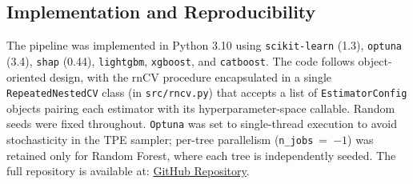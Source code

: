 \subsection{Implementation and Reproducibility}
\label{sec:implementation}

The pipeline was implemented in Python 3.10 using \texttt{scikit-learn} (1.3), \texttt{optuna} (3.4), \texttt{shap} (0.44), \texttt{lightgbm}, \texttt{xgboost}, and \texttt{catboost}. The code follows object-oriented design, with the rnCV procedure encapsulated in a single \texttt{RepeatedNestedCV} class (in \texttt{src/rncv.py}) that accepts a list of \texttt{EstimatorConfig} objects pairing each estimator with its hyperparameter-space callable. Random seeds were fixed throughout. \texttt{Optuna} was set to single-thread execution to avoid stochasticity in the TPE sampler; per-tree parallelism (\texttt{n\_jobs}~=~$-1$) was retained only for Random Forest, where each tree is independently seeded. The full repository is available at: \href{https://github.com/GiorgosBoulogeorgos/Machine-learning-in-computational-biology-assignment2-}{GitHub Repository}.
